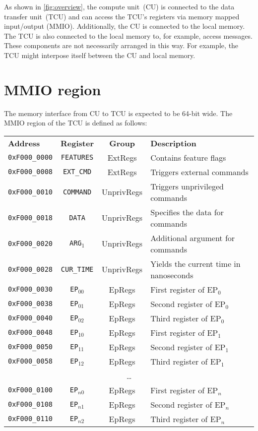 \documentclass[a4paper,11pt,draft]{article}
\newcommand{\rref}[2][]{\autoref{#2}}
\begin{document}
As shown in \rref{fig:overview}, the compute unit~(CU) is connected to the data transfer unit~(TCU)
and can access the TCU's registers via memory mapped input/output (MMIO). Additionally, the CU is
connected to the local memory. The TCU is also connected to the local memory to, for example, access
messages. These components are not necessarily arranged in this way. For example, the TCU might
interpose itself between the CU and local memory.

\section{MMIO region}

The memory interface from CU to TCU is expected to be 64-bit wide. The MMIO region of the TCU is
defined as follows:

\vspace{2ex}
\noindent
\begin{tabular}{ p{3cm} | c | c | l }
  \textbf{Address} & \textbf{Register} & \textbf{Group} & \textbf{Description} \\
  \texttt{0xF000\_0000} & \texttt{FEATURES} & ExtRegs & Contains feature flags \\
  \hline
  \texttt{0xF000\_0008} & \texttt{EXT\_CMD} & ExtRegs & Triggers external commands \\
  \hline
  \texttt{0xF000\_0010} & \texttt{COMMAND} & UnprivRegs & Triggers unprivileged commands \\
  \hline
  \texttt{0xF000\_0018} & \texttt{DATA} & UnprivRegs & Specifies the data for commands \\
  \hline
  \texttt{0xF000\_0020} & \texttt{ARG$_1$} & UnprivRegs & Additional argument for commands \\
  \hline
  \texttt{0xF000\_0028} & \texttt{CUR\_TIME} & UnprivRegs & Yields the current time in nanoseconds \\
  \hline
  \texttt{0xF000\_0030} & \texttt{EP$_{00}$} & EpRegs & First register of EP$_0$ \\
  \texttt{0xF000\_0038} & \texttt{EP$_{01}$} & EpRegs & Second register of EP$_0$ \\
  \texttt{0xF000\_0040} & \texttt{EP$_{02}$} & EpRegs & Third register of EP$_0$ \\
  \hline
  \texttt{0xF000\_0048} & \texttt{EP$_{10}$} & EpRegs & First register of EP$_1$ \\
  \texttt{0xF000\_0050} & \texttt{EP$_{11}$} & EpRegs & Second register of EP$_1$ \\
  \texttt{0xF000\_0058} & \texttt{EP$_{12}$} & EpRegs & Third register of EP$_1$ \\
  \hline
  \multicolumn{4}{c}{\dots} \\
  \hline
  \texttt{0xF000\_0100} & \texttt{EP$_{n0}$} & EpRegs & First register of EP$_{n}$ \\
  \texttt{0xF000\_0108} & \texttt{EP$_{n1}$} & EpRegs & Second register of EP$_{n}$ \\
  \texttt{0xF000\_0110} & \texttt{EP$_{n2}$} & EpRegs & Third register of EP$_{n}$ \\
\end{tabular}
\end{document}
